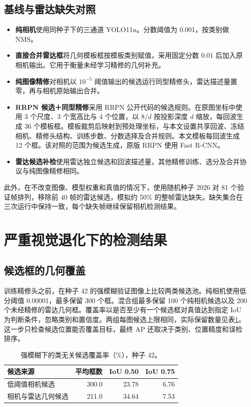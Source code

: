 \documentclass[conference,10pt,a4paper]{IEEEtran}
\begin{document}
\subsection{基线与雷达缺失对照}
\begin{itemize}
 \item \textbf{纯相机}使用同种子下的三通道 YOLO11n。分数阈值为 0.001，按类别做 NMS。
 \item \textbf{直接合并雷达框}将几何模板框按模板类别赋值，采用固定分数 0.01 后加入原相机输出。它用于衡量未经学习精修的几何补充。
 \item \textbf{纯图像精修}对相机以 $10^{-5}$ 阈值输出的候选运行同型精修头，雷达描述量置零，再与相机原始输出合并。
 \item \textbf{RRPN 候选＋同型精修}采用 RRPN 公开代码的候选规则\cite{rrpn}。在原图坐标中使用 3 个尺度、3 个宽高比与 4 个位置，以 $8/d$ 按投影深度 $d$ 缩放，每回波生成 36 个模板框。模板裁剪后映射到预处理坐标，与本文设置共享回波、冻结相机、精修头结构、训练步数、分数选择及合并规则。本文模板每回波生成 12 个框。该对照的范围为候选生成，原版 RRPN 使用 Fast R-CNN。
 \item \textbf{雷达候选补检}使用雷达独立候选和回波描述量，其他精修训练、选分及合并协议与纯图像精修相同。
\end{itemize}
此外，在不改变图像、模型权重和真值的情况下，使用随机种子 2026 对 81 个验证帧排列，移除前 40 帧的雷达候选，模拟约 50\% 的整帧雷达缺失。缺失集合在三次运行中保持一致，每个缺失帧继续保留相机检测结果。

\section{严重视觉退化下的检测结果}
\subsection{候选框的几何覆盖}
训练精修头之前，在种子 42 的强模糊验证图像上比较两类候选池。纯相机使用低分阈值 0.00001，最多保留 300 个框。混合组最多保留 100 个纯相机候选以及 200 个未经精修的雷达几何框。覆盖率以是否至少有一个候选框对真值达到指定 IoU 为判断条件，忽略类别和置信度。两组每图候选上限相同，实际保留数量见表\ref{tab:coverage}。这一步只检查候选位置能否覆盖目标，最终 AP 还取决于类别、位置精度和误检排序。

\begin{table}[!t]
\centering\small
\setlength{\tabcolsep}{4pt}
\caption{强模糊下的类无关候选覆盖率（\%），种子 42。}\label{tab:coverage}
\begin{tabular}{lrrr}
\toprule
候选来源 & 平均框数 & IoU 0.50 & IoU 0.75 \\
\midrule
低阈值相机候选 & 300.0 & 23.78 & 6.76 \\
相机与雷达几何候选 & 211.0 & 34.64 & 7.53 \\
\bottomrule
\end{tabular}
\end{table}
\end{document}
